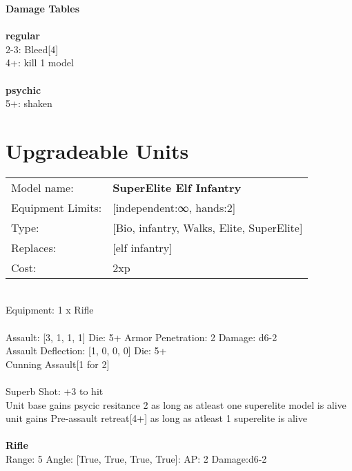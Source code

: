 {\bf Damage Tables} \\
\ \\ {\bf regular } \\
2-3: Bleed[4] \\
4+: kill 1 model \\
\ \\ {\bf psychic } \\
5+: shaken \\










\pagebreak\section{Upgradeable Units}\noindent
\begin{tabular}{ll}
Model name: &{\bf SuperElite Elf Infantry } \\
Equipment Limits: &[independent:∞, hands:2] \\
Type: &[Bio, infantry, Walks, Elite, SuperElite] \\
Replaces: &[elf infantry] \\
Cost: & 2xp\\
\end{tabular}
\ \\
Equipment: 1 x Rifle \\
\ \\
Assault: [3, 1, 1, 1] Die: 5+ Armor Penetration: 2 Damage: d6-2 \\
Assault Deflection: [1, 0, 0, 0] Die: 5+\\
\indent Cunning Assault[1 for 2]\\ 
 
\ \\
Superb Shot: +3 to hit\\ 
Unit base gains psycic resitance 2 as long as atleast one superelite model is alive\\ 
unit gains Pre-assault retreat[4+] as long as atleast 1 superelite is alive\\ 

\ \\
{\bf Rifle } \\



Range: 5  Angle: [True, True, True, True]: AP: 2 Damage:d6-2 \\




